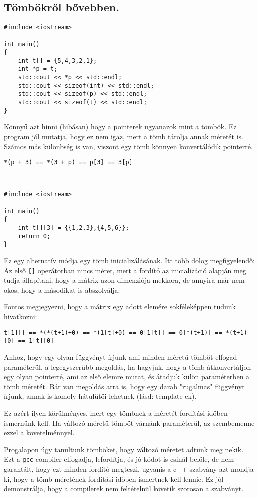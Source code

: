 \documentclass[a4paper,11.5pt]{article}
\begin{document}
	\subsection{Tömbökről bővebben.}
	\begin{example}
		\begin{lstlisting}
#include <iostream>

int main()
{
	int t[] = {5,4,3,2,1};
	int *p = t;
	std::cout << *p << std::endl;
	std::cout << sizeof(int) << std::endl;
	std::cout << sizeof(p) << std::endl;
	std::cout << sizeof(t) << std::endl;
}
		\end{lstlisting}
		Könnyű azt hinni (hibásan) hogy a pointerek ugyanazok mint a tömbök. Ez  program jól mutatja, hogy ez nem igaz, mert a tömb tárolja annak méretét is. Számos más különbség is van, viszont egy tömb könnyen konvertálódik pointerré.
		
		{\centering \texttt{*(p + 3) == *(3 + p) == p[3] == 3[p]} \par}
	\end{example}
	\begin{example}
		\
		\begin{lstlisting}
#include <iostream>

int main()
{
	int t[][3] = {{1,2,3},{4,5,6}};
	return 0;
}
		\end{lstlisting}
		Ez egy alternatív módja egy tömb inicializálásának. Itt több dolog megfigyelendő: Az első \texttt{[]} operátorban nincs méret, mert a fordító az inicializáció alapján meg tudja állapítani, hogy a mátrix azon dimenziója mekkora, de annyira már nem okos, hogy a másodikat is abszolválja.
		
		\medskip
		Fontos megjegyezni, hogy a mátrix egy adott elemére sokféleképpen tudunk hivatkozni:
		
		{\centering \texttt{t[1][] == *(*(t+1)+0) == *(1[t]+0) == 0[1[t]] == 0[*(t+1)] == *(t+1)[0] == 1[t][0] } \par}
	\end{example}
	\begin{note}
		Ahhoz, hogy egy olyan függvényt írjunk ami minden méretű tömböt elfogad paraméterül, a legegyszerűbb megoldás, ha hagyjuk, hogy a tömb átkonvertáljon egy olyan pointerré, ami az első elemre mutat, és átadjuk külön paraméterben a tömb méretét. Bár van megoldás arra is, hogy egy darab "rugalmas" függvényt írjunk, annak is komoly hátulütői lehetnek (lásd: template-ek).
		
		\smallskip
		Ez azért ilyen körülményes, mert egy tömbnek a méretét fordítási időben ismernünk kell. Ha változó méretű tömböt várnánk paraméterül, az szembemenne ezzel a követelménnyel.  
	\end{note}
	\begin{note}
		Progalapon úgy tanultunk tömböket, hogy változó méretet adtunk meg nekik. Ezt a \texttt{gcc} compiler elfogadja, lefordítja, és jó kódot is csinál belőle, de nem garantált, hogy ezt minden fordító megteszi, ugyanis a c++ szabvány azt mondja ki, hogy a tömb méretének fordítási időben ismertnek kell lennie. Ez jól demonstrálja, hogy a compilerek nem feltételnül követik szorosan a szabványt.
	\end{note}
\end{document}
